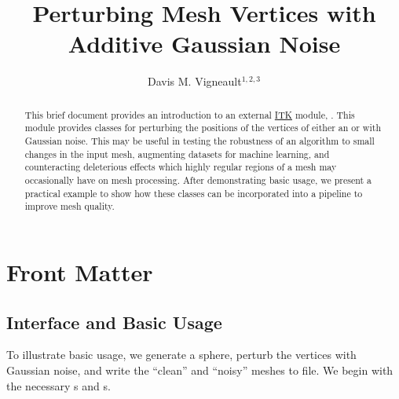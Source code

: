 \documentclass{InsightArticle}
\title{Perturbing Mesh Vertices with Additive Gaussian Noise}
\author{Davis M. Vigneault$^{1,2,3}$}
\newcommand{\IJhandlerIDnumber}{3567}
\begin{document}
%
%
\IJhandlefooter{\IJhandlerIDnumber}


\ifpdf
\else
\fi


\maketitle


\ifhtml
\chapter*{Front Matter\label{front}}
\fi


\begin{abstract}
\noindent
This brief document provides an introduction to an external \href{wwwk.itk.org}{ITK} module, .  This module provides classes for perturbing the positions of the vertices of either an  or  with Gaussian noise.  This may be useful in testing the robustness of an algorithm to small changes in the input mesh, augmenting datasets for machine learning, and counteracting deleterious effects which highly regular regions of a mesh may occasionally have on mesh processing.  After demonstrating basic usage, we present a practical example to show how these classes can be incorporated into a pipeline to improve mesh quality.

\end{abstract}

\IJhandlenote{\IJhandlerIDnumber}

\tableofcontents


\section{Interface and Basic Usage}

To illustrate basic usage, we generate a sphere, perturb the vertices with Gaussian noise, and write the ``clean'' and ``noisy'' meshes to file.  We begin with the necessary s and s.
\end{document}
